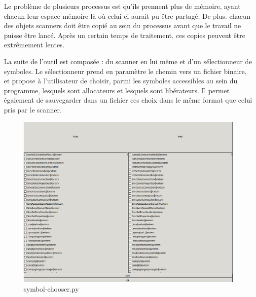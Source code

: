 Le problème de plusieurs processus est qu'ils prennent plus de mémoire, ayant chacun leur espace mémoire là où celui-ci aurait pu être partagé. De plus. chacun des objets scanners doit être copié
au sein du processus avant que le travail ne puisse être lancé. Après un certain temps de traitement, ces copies peuvent être extrêmement lentes.

La suite de l'outil est composée : du scanner en lui même et d'un sélectionneur de symboles.
Le sélectionneur prend en paramètre le chemin vers un fichier binaire, et propose à l'utilisateur de choisir, parmi les symboles accessibles au sein du programme,
lesquels sont allocateurs et lesquels sont libérateurs. Il permet également de sauvegarder dans un fichier ces choix dans le même format que celui pris par le scanner.
\begin{figure}[h]
    \centering
    \includegraphics[scale=0.3]{images/symbol-chooser.png}\newline
    \caption{symbol-chooser.py}
\end{figure}

